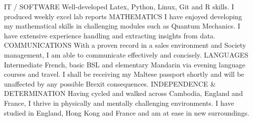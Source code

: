 \begin{cvhonors}
  \cvhonor
    {IT / SOFTWARE}
    {Well-developed Latex, Python, Linux, Git and R skills. I produced weekly excel lab reports }
    {}
    {}
  \cvhonor
    {MATHEMATICS}
    {I have enjoyed developing my mathematical skills in challenging modules such as Quantum Mechanics. I have extensive experience handling and extracting insights from data.}
    {}
    {}
    \cvhonor
    {COMMUNICATIONS}
    {With a proven record in a sales environment and Society management, I am able to communicate effectively and concisely.}
    {}
    {}
    \cvhonor
    {LANGUAGES}
    {Intermediate French, basic BSL and elementary Mandarin via evening language courses and travel. I shall be receiving my Maltese passport shortly and will be unaffected by any possible Brexit consequences.}
    {}
    {}
    \cvhonor
    {INDEPENDENCE \& DETERMINATION}
    {Having cycled and walked across Cambodia, England and France, I thrive in physically and mentally challenging environments. I have studied in England, Hong Kong and France and am at ease in new surroundings.}
    {}
    {}
\end{cvhonors}
